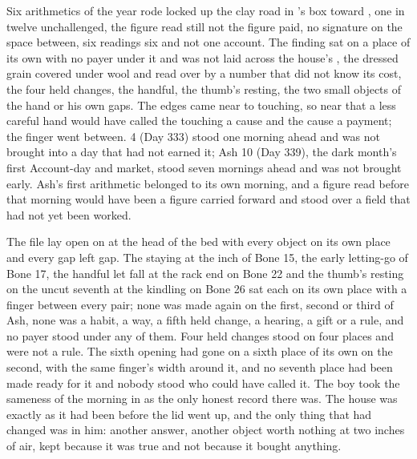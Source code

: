 Six arithmetics of the year rode locked up the clay road in 's box toward , one in twelve unchallenged, the figure read still not the figure paid, no signature on the space between, six readings six and not one account. The finding sat on a place of its own with no payer under it and was not laid across the house's , the dressed grain covered under wool and read over by a number that did not know its cost, the four held changes, the handful, the thumb's resting, the two small objects of the hand or his own gaps. The edges came near to touching, so near that a less careful hand would have called the touching a cause and the cause a payment; the finger went between.  4 (Day 333) stood one morning ahead and was not brought into a day that had not earned it; Ash 10 (Day 339), the dark month's first Account-day and market, stood seven mornings ahead and was not brought early. Ash's first arithmetic belonged to its own morning, and a figure read before that morning would have been a figure carried forward and stood over a field that had not yet been worked.

The file lay open on  at the head of the bed with every object on its own place and every gap left gap. The staying at the inch of Bone 15, the early letting-go of Bone 17, the handful let fall at the rack end on Bone 22 and the thumb's resting on the uncut seventh at the kindling on Bone 26 sat each on its own place with a finger between every pair; none was made again on the first, second or third of Ash, none was a habit, a way, a fifth held change, a hearing, a gift or a rule, and no payer stood under any of them. Four held changes stood on four places and were not a rule. The sixth opening had gone on a sixth place of its own on the second, with the same finger's width around it, and no seventh place had been made ready for it and nobody stood who could have called it. The boy took the sameness of the morning in as the only honest record there was. The house was exactly as it had been before the lid went up, and the only thing that had changed was in him: another answer, another object worth nothing at two inches of air, kept because it was true and not because it bought anything.

